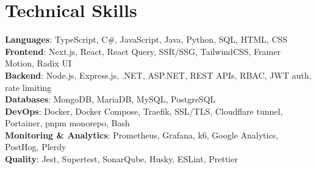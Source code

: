 \section{Technical Skills}
    \begin{itemize}[leftmargin=0.15in, label={}]
	\small{\item{
		\textbf{Languages}{: TypeScript, C\#, JavaScript, Java, Python, SQL, HTML, CSS} \\
		\textbf{Frontend}{: Next.js, React, React Query, SSR/SSG, TailwindCSS, Framer Motion, Radix UI} \\
		\textbf{Backend}{: Node.js, Express.js, .NET, ASP.NET, REST APIs, RBAC, JWT auth, rate limiting} \\
		\textbf{Databases}{: MongoDB, MariaDB, MySQL, PostgreSQL} \\
		\textbf{DevOps}{: Docker, Docker Compose, Traefik, SSL/TLS, Cloudflare tunnel, Portainer, pnpm monorepo, Bash} \\
		\textbf{Monitoring \& Analytics}{: Prometheus, Grafana, k6, Google Analytics, PostHog, Plerdy} \\
		\textbf{Quality}{: Jest, Supertest, SonarQube, Husky, ESLint, Prettier}
	}}
    \end{itemize}
